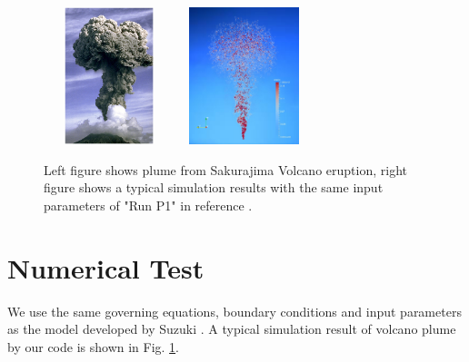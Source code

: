 \documentclass[procedia]{easychair}
\begin{document}
\begin{figure}[!t]
\centering
\includegraphics[width=3.8cm,height=4.0cm]{plume_photo}
\hfil
\includegraphics[width=3.8cm,height=4.0cm]{Plume_simulation}
\caption{Left figure shows plume from Sakurajima Volcano eruption\cite{PlumePhoto}, right figure shows a typical simulation results with the same input parameters of "Run P1" in reference \cite{suzuki2005numerical}.}
\label{fig:Plume}
\end{figure}
\section{Numerical Test}
We use the same governing equations, boundary conditions and input parameters as the model developed by Suzuki \cite{suzuki2005numerical}. %
A typical simulation result of volcano plume by our code is shown in Fig. \ref{fig:Plume}.
%
\end{document}
